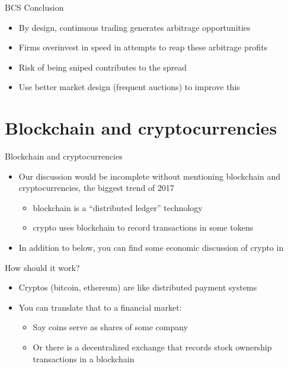 \documentclass[english,10pt
,aspectratio=169
]{beamer}
\begin{document}
\begin{frame}{BCS Conclusion}
	\begin{itemize}
		\item By design, continuous trading generates arbitrage opportunities
		\item Firms overinvest in speed in attempts to reap these arbitrage profits
		\item Risk of being sniped contributes to the spread
		\item Use better market design (frequent auctions) to improve this
	\end{itemize}
\end{frame}



\section{Blockchain and cryptocurrencies}

\begin{frame}{Blockchain and cryptocurrencies}
	\begin{itemize}
		\item Our discussion would be incomplete without mentioning \alert{blockchain} and \alert{cryptocurrencies}, the biggest trend of 2017
		\begin{itemize}
			\item blockchain is a ``distributed ledger'' technology
			\item crypto uses blockchain to record transactions in some tokens
		\end{itemize}
		\item In addition to below, you can find some economic discussion of crypto in \citet*{nica_cryptocurrencies_2017}
	\end{itemize}
\end{frame}


\begin{frame}{How should it work?}
	\begin{itemize}
		\item Cryptos (bitcoin, ethereum) are like distributed payment systems
		\item You can translate that to a financial market:
		\begin{itemize}
			\item Say coins serve as shares of some company
			\item Or there is a decentralized exchange that records stock ownership transactions in a blockchain
		\end{itemize}
	\end{itemize}
\end{frame}
\end{document}
